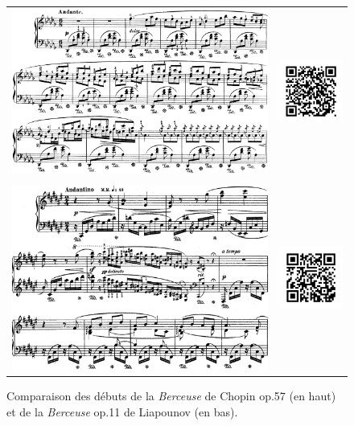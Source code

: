 \begin{figure}[!p]
  \begin{bigcenter}
    \begin{tabular}{lr}
      \vspace*{0.0cm}
      \includegraphics[width=12.5cm, keepaspectratio]{berceuse.png}
      &
      \includegraphics[width=3cm, keepaspectratio]{berceuse-qr.png}
      \\
      \vspace{0.5cm} &
      \\
      \includegraphics[width=12.5cm, keepaspectratio]{op11-i.png}
      &
      \includegraphics[width=3cm, keepaspectratio]{op11-qr.png}
    \end{tabular}
  \end{bigcenter}
  \caption{\label{op11-i}Comparaison des débuts de la \emph{Berceuse} de Chopin op.57 (en haut) et de la \emph{Berceuse} op.11 de Liapounov (en bas).}
\end{figure}


